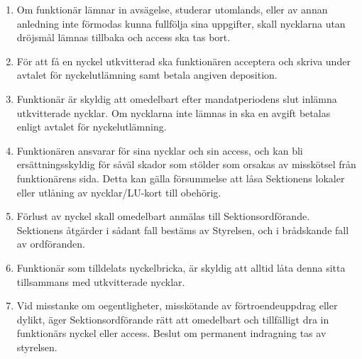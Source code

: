 \documentclass[../_main/handlingar.tex]{subfiles}
\begin{document}
\begin{enumerate}[label=\S\arabic*.]
    \item Om funktionär lämnar in avsägelse, studerar utomlands, eller av annan anledning inte förmodas kunna fullfölja sina uppgifter, skall nycklarna utan dröjsmål lämnas tillbaka och access ska tas bort.
    \item För att få en nyckel utkvitterad ska funktionären acceptera och skriva under avtalet för nyckelutlämning samt betala angiven deposition.
    \item Funktionär är skyldig att omedelbart efter mandatperiodens slut inlämna utkvitterade nycklar. Om nycklarna inte lämnas in ska en avgift betalas enligt avtalet för nyckelutlämning.
    \item Funktionären ansvarar för sina nycklar och sin access, och kan bli ersättningsskyldig för såväl skador som stölder som orsakas av misskötsel från funktionärens sida. Detta kan gälla försummelse att låsa Sektionens lokaler eller utlåning av nycklar/LU-kort till obehörig.
    \item Förlust av nyckel skall omedelbart anmälas till Sektionsordförande. Sektionens åtgärder i sådant fall bestäms av Styrelsen, och i brådskande fall av ordföranden.
    \item Funktionär som tilldelats nyckelbricka, är skyldig att alltid låta denna sitta tillsammans med utkvitterade nycklar.
    \item Vid misstanke om oegentligheter, misskötande av förtroendeuppdrag eller dylikt, äger Sektionsordförande rätt att omedelbart och tillfälligt dra in funktionärs nyckel eller access. Beslut om permanent indragning tas av styrelsen.
\end{enumerate}
\end{document}
